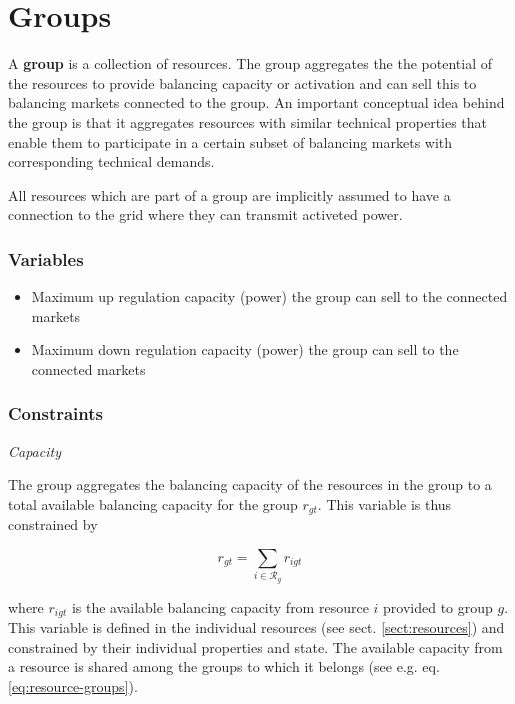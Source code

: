 \documentclass[]{report}
\renewcommand{\emph}{\textbf}
\newcommand{\resourcesg}{\mathcal{R}_g}
\newcommand{\rup}{r^{\uparrow}}
\newcommand{\rdown}{r^{\downarrow}}
\begin{document}
\newpage
\section{Groups}
\label{sect:groups}

A \emph{group} is a collection of resources. The group aggregates the the potential of the resources to provide balancing capacity or activation and can sell this to balancing markets connected to the group.  An important conceptual idea behind the group is that it aggregates resources with similar technical properties that enable them to participate in a certain subset of balancing markets with corresponding technical demands.

All resources which are part of a group are implicitly assumed to have a connection to the grid where they can transmit activeted power.

\subsubsection*{Variables}

\begin{itemize}
    \item [$\rup_{gt}$] Maximum up regulation capacity (power) the group can sell to the connected markets
    \item [$\rdown_{gt}$] Maximum down regulation capacity (power) the group can sell to the connected markets
\end{itemize}

\subsubsection*{Constraints}

\textit{Capacity}

The group aggregates the balancing capacity of the resources in the group to a total available balancing capacity for the group $r_{gt}$. This variable is thus constrained by

\begin{equation}
     r_{gt} = \sum_{i \in \resourcesg} r_{igt}
\end{equation}

where $r_{igt}$ is the available balancing capacity from resource $i$ provided to group $g$. This variable is defined in the individual resources (see sect. \ref{sect:resources}) and constrained by their individual properties and state. The available capacity from a resource is shared among the groups to which it belongs (see e.g. eq. \ref{eq:resource-groups}). 
\end{document}
